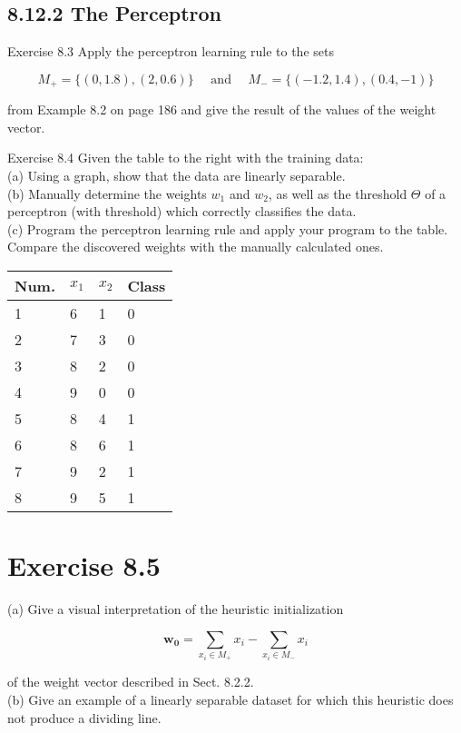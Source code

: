\documentclass[10pt]{article}
\begin{document}
\subsection*{8.12.2 The Perceptron}
Exercise 8.3 Apply the perceptron learning rule to the sets

$$
M_{+}=\{(0,1.8),(2,0.6)\} \quad \text { and } \quad M_{-}=\{(-1.2,1.4),(0.4,-1)\}
$$

from Example 8.2 on page 186 and give the result of the values of the weight vector.

Exercise 8.4 Given the table to the right with the training data:\\
(a) Using a graph, show that the data are linearly separable.\\
(b) Manually determine the weights $w_{1}$ and $w_{2}$, as well as the threshold $\Theta$ of a perceptron (with threshold) which correctly classifies the data.\\
(c) Program the perceptron learning rule and apply your program to the table. Compare the discovered weights with the manually calculated ones.

\begin{center}
\begin{tabular}{llll}
\hline
Num. & $x_{1}$ & $x_{2}$ & Class \\
\hline
1 & 6 & 1 & 0 \\
\hline
2 & 7 & 3 & 0 \\
\hline
3 & 8 & 2 & 0 \\
\hline
4 & 9 & 0 & 0 \\
\hline
5 & 8 & 4 & 1 \\
\hline
6 & 8 & 6 & 1 \\
\hline
7 & 9 & 2 & 1 \\
\hline
8 & 9 & 5 & 1 \\
\hline
\end{tabular}
\end{center}

\section*{Exercise 8.5}
(a) Give a visual interpretation of the heuristic initialization

$$
\boldsymbol{w}_{\mathbf{0}}=\sum_{x_{i} \in M_{+}} x_{i}-\sum_{x_{i} \in M_{-}} x_{i}
$$

of the weight vector described in Sect. 8.2.2.\\
(b) Give an example of a linearly separable dataset for which this heuristic does not produce a dividing line.
\end{document}
